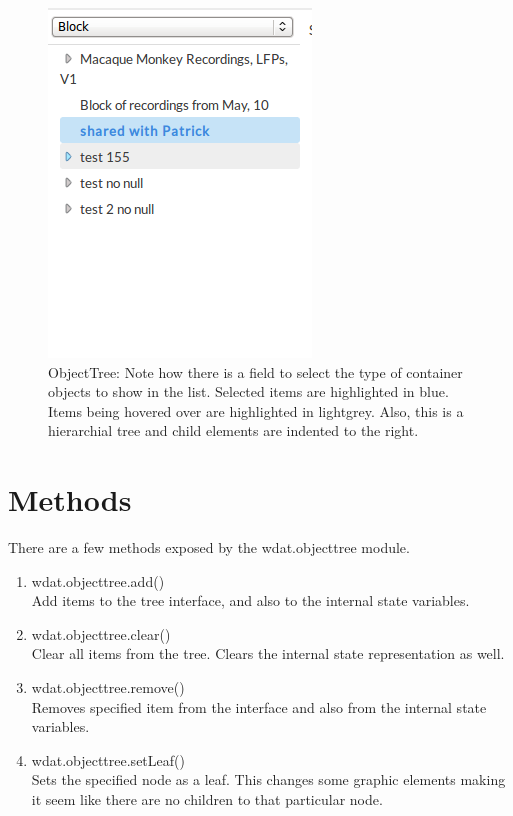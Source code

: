 \begin{figure}[h!t]
  \centering
  \includegraphics[scale=1.0]{src/images/wdat-object-tree.png}
  \caption{ObjectTree: Note how there is a field to select the type of container objects to show in the list.  Selected items are highlighted in blue.  Items being hovered over are highlighted in lightgrey.  Also, this is a hierarchial tree and child elements are indented to the right. }
\end{figure}

\section{Methods}

There are a few methods exposed by the wdat.objecttree module.

\begin{enumerate}
  \item{wdat.objecttree.add()} \hfill \\
  Add items to the tree interface, and also to the internal state
  variables.

  \item{wdat.objecttree.clear()} \hfill \\
  Clear all items from the tree.  Clears the internal state
  representation as well. 

  \item{wdat.objecttree.remove()} \hfill \\
  Removes specified item from the interface and also from the internal
  state variables.

  \item{wdat.objecttree.setLeaf()} \hfill \\
  Sets the specified node as a leaf.  This changes some graphic
  elements making it seem like there are no children to that
  particular node.
\end{enumerate}
